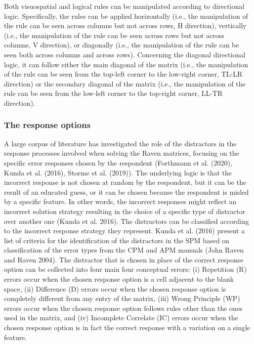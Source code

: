 Both visuospatial and logical rules can be manipulated according to directional logic.
Specifically, the rules can be applied horizontally (i.e., the manipulation of the rule can be seen across columns but not across rows, H direction), vertically (i.e., the manipulation of the rule can be seen across rows but not across columns, V direction), or diagonally (i.e., the manipulation of the rule can be seen both across columns and across rows). Concerning the diagonal directional logic, it can follow either the main diagonal of the matrix (i.e., the manipulation of the rule can be seen from the top-left corner to the low-right corner, TL-LR direction) or the secondary diagonal of the matrix (i.e., the manipulation of the rule can be seen from the low-left corner to the top-right corner, LL-TR direction).

\subsubsection{The response options}\label{the-response-options}

A large corpus of literature has investigated the role of the distractors in the response processes involved when solving the Raven matrices, focusing on the specific error responses chosen by the respondent (Forthmann et al. (2020), Kunda et al. (2016), Storme et al. (2019)).
The underlying logic is that the incorrect response is not chosen at random by the respondent, but it can be the result of an educated guess, or it can be chosen because the respondent is misled by a specific feature.
In other words, the incorrect responses might reflect an incorrect solution strategy resulting in the choice of a specific type of distractor over another one (Kunda et al. 2016). The distractors can be classified according to the incorrect response strategy they represent.
Kunda et al. (2016) present a list of criteria for the identification of the distractors in the SPM based on classification of the error types from the CPM and APM manuals (John Raven and Raven 2004). The distractor that is chosen in place of the correct response option can be collected into four main four conceptual errors: (i) Repetition (R) errors occur when the chosen response option is a cell adjacent to the blank space, (ii) Difference (D) errors occur when the chosen response option is completely different from any entry of the matrix, (iii) Wrong Principle (WP) errors occur when the chosen response option follows rules other than the ones used in the matrix, and (iv) Incomplete Correlate (IC) errors occur when the chosen response option is in fact the correct response with a variation on a single feature.

